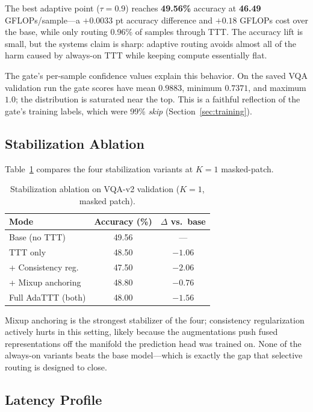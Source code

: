 \documentclass[conference]{IEEEtran}
\begin{document}
The best adaptive point ($\tau{=}0.9$) reaches \textbf{49.56\%} accuracy
at \textbf{46.49} GFLOPs/sample---a $+0.0033$ pt accuracy difference and
$+0.18$ GFLOPs cost over the base, while only routing 0.96\% of samples
through TTT. The accuracy lift is small, but the systems claim is sharp:
adaptive routing avoids almost all of the harm caused by always-on TTT
while keeping compute essentially flat.

The gate's per-sample confidence values explain this behavior. On the
saved VQA validation run the gate scores have mean $0.9883$, minimum
$0.7371$, and maximum $1.0$; the distribution is saturated near the
top. This is a faithful reflection of the gate's training labels, which
were 99\% \emph{skip} (Section~\ref{sec:training}).

\subsection{Stabilization Ablation}

Table~\ref{tab:stab} compares the four stabilization variants at $K{=}1$
masked-patch.

\begin{table}[!t]
\caption{Stabilization ablation on VQA-v2 validation
($K{=}1$, masked patch).}
\label{tab:stab}
\centering\footnotesize
\begin{tabular}{lcc}
\toprule
\textbf{Mode} & \textbf{Accuracy (\%)} & \textbf{$\Delta$ vs.\ base} \\
\midrule
Base (no TTT)     & 49.56 & --- \\
TTT only          & 48.50 & $-1.06$ \\
+ Consistency reg.\ & 47.50 & $-2.06$ \\
+ Mixup anchoring & 48.80 & $-0.76$ \\
Full AdaTTT (both)& 48.00 & $-1.56$ \\
\bottomrule
\end{tabular}
\end{table}

Mixup anchoring is the strongest stabilizer of the four; consistency
regularization actively hurts in this setting, likely because the
augmentations push fused representations off the manifold the prediction
head was trained on. None of the always-on variants beats the base
model---which is exactly the gap that selective routing is designed to
close.

\subsection{Latency Profile}
\end{document}
